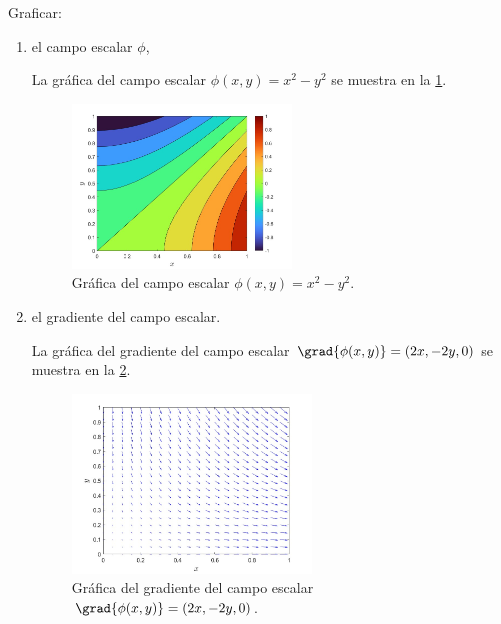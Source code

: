 \documentclass[./../main.tex]{subfiles}
\begin{document}
    \pagebreak
    Graficar:
    \begin{enumerate}[label=\arabic*), resume]
        \item el campo escalar \(\phi\),
        
        La gráfica del campo escalar \(\phi(x, y) = x^{2} - y^{2}\) se muestra en la \cref{fig:scalar-field}.

        \begin{figure}[htb]
            \centering
            \includegraphics[width=0.55\textwidth]{campo-escalar}
            \caption{Gráfica del campo escalar \(\phi(x, y) = x^{2} - y^{2}\).}
            \label{fig:scalar-field}
        \end{figure}
        
        \item el gradiente del campo escalar.
        
        La gráfica del gradiente del campo escalar \(\grad{\phi(x, y)} = (2x, -2y, 0)\) se muestra en la \cref{fig:gradient-scalar-field}.

        \begin{figure}[htb]
            \centering
            \includegraphics[width=0.6\textwidth]{gradiente-campo-escalar}
            \caption{Gráfica del gradiente del campo escalar \(\grad{\phi(x, y)} = (2x, -2y, 0)\).}
            \label{fig:gradient-scalar-field}
        \end{figure}
    \end{enumerate}
\end{document}
